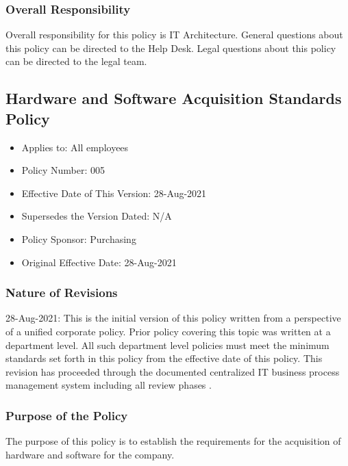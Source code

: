 \documentclass[stu]{apa7}
\begin{document}
\subsubsection{Overall Responsibility}
\label{sec:org1831ee7}

Overall responsibility for this policy is IT Architecture. General questions about this policy can be directed to the Help Desk. Legal questions about this policy can be directed to the legal team.

\subsection{Hardware and Software Acquisition Standards Policy}
\label{sec:org54f141e}

\begin{itemize}
\item Applies to: All employees
\item Policy Number: 005
\item Effective Date of This Version: 28-Aug-2021
\item Supersedes the Version Dated: N/A
\item Policy Sponsor: Purchasing
\item Original Effective Date: 28-Aug-2021
\end{itemize}

\subsubsection{Nature of Revisions}
\label{sec:orge9c9506}

28-Aug-2021: This is the initial version of this policy written from a perspective of a unified corporate policy. Prior policy covering this topic was written at a department level. All such department level policies must meet the minimum standards set forth in this policy from the effective date of this policy. This revision has proceeded through the documented centralized IT business process management system including all review phases \cite{wagleDevelopmentEffectiveCentralized2021}.

\subsubsection{Purpose of the Policy}
\label{sec:orgde61e48}

The purpose of this policy is to establish the requirements for the acquisition of hardware and software for the company.
\end{document}
